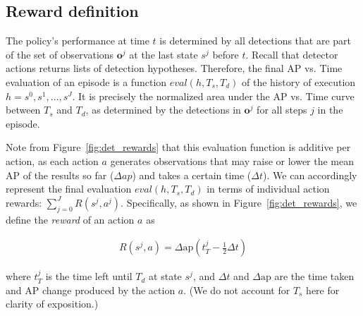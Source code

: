\subsection{Reward definition}\label{sec:det_reward}

The policy's performance at time $t$ is determined by all detections that are part of the set of observations $\mathbf{o}^j$ at the last state $s^j$ before $t$.
Recall that detector actions returns lists of detection hypotheses.
Therefore, the final AP vs. Time evaluation of an episode is a function $eval(h,T_s,T_d)$ of the history of execution $h=s^0,s^1,\dots,s^J$.
It is precisely the normalized area under the AP vs. Time curve between $T_s$ and $T_d$, as determined by the detections in $\mathbf{o}^j$ for all steps $j$ in the episode.



Note from Figure~\ref{fig:det_rewards} that this evaluation function is additive per action, as each action $a$ generates observations that may raise or lower the mean AP of the results so far ($\Delta ap$) and takes a certain time ($\Delta t$).
We can accordingly represent the final evaluation $eval(h,T_s,T_d)$ in terms of individual action rewards: $\sum_{j=0}^J R(s^j,a^j)$.
Specifically, as shown in Figure~\ref{fig:det_rewards}, we define the \emph{reward} of an action $a$ as

\begin{align}\label{eq:det_reward}
R(s^j,a) = \Delta \text{ap} (t_T^j-\frac{1}{2}\Delta t)
\end{align}

where $t_T^j$ is the time left until $T_d$ at state $s^j$, and $\Delta t$ and $\Delta \text{ap}$ are the time taken and AP change produced by the action $a$.
(We do not account for $T_s$ here for clarity of exposition.)
